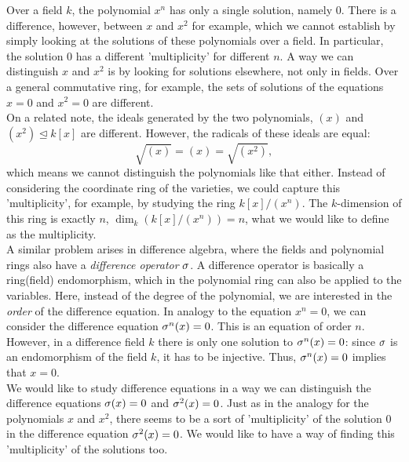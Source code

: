 Over a field $k$, the polynomial $x^n$ has only a single solution, namely $0$. 
There is a difference, however, between $x$ and $x^2$ for example, which we cannot establish by simply looking at the solutions of these polynomials over a field.
In particular, the solution $0$ has a different 'multiplicity' for different $n$.  A way we can distinguish $x$ and $x^2$ is by looking for solutions elsewhere, not only in fields.
Over a general commutative ring, for example, the sets of solutions of the equations $x = 0$ and $x^2 = 0$ are different. \\


On a related note, the ideals generated by the two polynomials, $(x)$ and $(x^2) \unlhd k[x]$ are different. However, the radicals of these ideals are equal: 
$$ \sqrt{ (x) } = (x) = \sqrt{(x^2)}, $$ which means we cannot distinguish the polynomials like that either.
Instead of considering the coordinate ring of the varieties, we could capture this 'multiplicity', for example, by studying the ring $k[x]/(x^n)$.
The $k$-dimension of this ring is exactly $n$, $\operatorname{dim}_k( k[x]/(x^n)) = n$, what we would like to define as the multiplicity. \\

A similar problem arises in difference algebra, where the fields and polynomial rings also have a \emph{difference operator} $\sigma$.
A difference operator is basically a ring(field) endomorphism, which in the polynomial ring can also be applied to the variables.
Here, instead of the degree of the polynomial, we are interested in the \emph{order} of the difference equation.
In analogy to the equation $x^n = 0$, we can consider the difference equation $\sigma^n(x) = 0$. This is an equation of order $n$.
However, in a difference field $k$ there is only one solution to $\sigma^n(x) = 0$: since $\sigma$ is an endomorphism of the field $k$,
it has to be injective. Thus, $\sigma^n(x) = 0$ implies that $x = 0$. \\

We would like to study difference equations in a way we can distinguish the difference equations $\sigma(x) = 0$ and $\sigma^2(x) = 0$. Just as in the analogy for the polynomials $x$ and $x^2$,
there seems to be a sort of 'multiplicity' of the solution $0$ in the difference equation $\sigma^2(x) = 0$. We would like to have a way of finding this 'multiplicity' of the solutions too.

